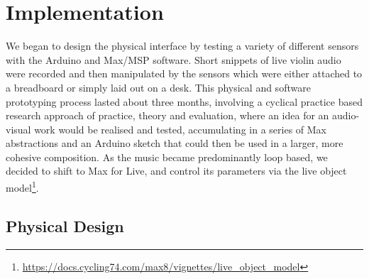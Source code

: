 \documentclass{nime-alternate}
\begin{document}
 

\section{Implementation}

We began to design the physical interface by testing a variety of different sensors with the Arduino and Max/MSP software. Short snippets of live violin audio were recorded and then manipulated by the sensors which were either attached to a breadboard or simply laid out on a desk. This physical and software prototyping process lasted about three months, involving a cyclical practice based research approach of practice, theory and evaluation\cite{candy:practice}\cite{candy:guide}, where an idea for an audio-visual work would be realised and tested, accumulating in a series of Max abstractions and an Arduino sketch that could then be used in a larger, more cohesive composition. As the music became predominantly loop based, we decided to shift to Max for Live, and control its parameters via the live object model\footnote{\url{https://docs.cycling74.com/max8/vignettes/live_object_model}}.


\subsection{Physical Design}
\end{document}

